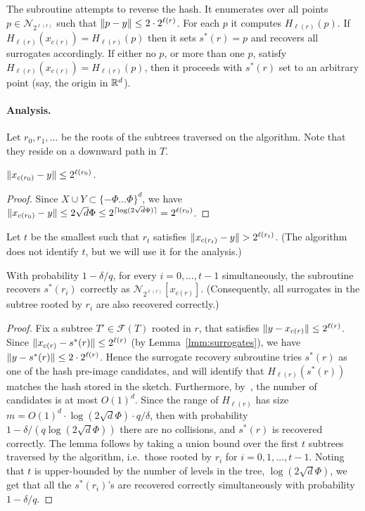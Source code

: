 The subroutine attempts to reverse the hash.
It enumerates over all points $p\in \mathcal N_{2^{\ell(r)}}$ such that $\lVert p-y\rVert\leq2\cdot2^{\ell(r)}$.
For each $p$ it computes $H_{\ell(r)}(p)$.
If $H_{\ell(r)}(x_{c(r)})=H_{\ell(r)}(p)$ then it sets $s^*(r)=p$ and recovers all surrogates accordingly.
If either no $p$, or more than one $p$, satisfy $H_{\ell(r)}(x_{c(r)})=H_{\ell(r)}(p)$, then it proceeds with $s^*(r)$ set to an arbitrary point (say, the origin in $\mathbb R^d$).

\paragraph{Analysis.} Let $r_0,r_1,\ldots$ be the roots of the subtrees traversed on the algorithm.
Note that they reside on a downward path in $T$.

\begin{claim}
$\lVert x_{c(r_0)}-y\rVert \leq 2^{\ell(r_0)}$.
\end{claim}
\begin{proof}
Since $X\cup Y\subset\{-\Phi \ldots \Phi\}^d$, we have $\lVert x_{c(r_0)}-y\rVert \leq 2\sqrt{d}\Phi\leq2^{\lceil\log(2\sqrt d\Phi)\rceil}=2^{\ell(r_0)}$.
\end{proof}

Let $t$ be the smallest such that $r_t$ satisfies $\lVert x_{c(r_t)}-y\rVert>2^{\ell(r_t)}$.
(The algorithm does not identify $t$, but we will use it for the analysis.)

\begin{lemma}\label{lmm:hashes}
With probability $1-\delta/q$, for every $i=0,\ldots,t-1$ simultaneously,
the subroutine recovers $s^*(r_i)$ correctly as $\mathcal N_{2^{\ell(r)}}[x_{c(r)}]$.
(Consequently, all surrogates in the subtree rooted by $r_i$ are also recovered correctly.)
\end{lemma}
\begin{proof}
Fix a subtree $T'\in\mathcal F(T)$ rooted in $r$, that satisfies $\lVert y-x_{c(r)}\rVert\leq2^{\ell(r)}$.
Since $\lVert x_{c(r)}-s^*(r)\rVert\leq2^{\ell(r)}$ (by Lemma~\ref{lmm:surrogates}), we have $\lVert y-s^*(r)\rVert\leq2\cdot2^{\ell(r)}$.
Hence the surrogate recovery subroutine tries $s^*(r)$ as one of the hash pre-image candidates, and will identify that $H_{\ell(r)}(s^*(r))$ matches the hash stored in the sketch.
Furthermore, by~, the number of candidates is at most $O(1)^d$.
Since the range of $H_{\ell(r)}$ has size $m=O(1)^d\cdot\log(2\sqrt d\Phi)\cdot q/\delta$, then with probability $1-\delta/(q\log(2\sqrt d\Phi))$ there are no collisions, and $s^*(r)$ is recovered correctly.
The lemma follows by taking a union bound over the first $t$ subtrees traversed by the algorithm, i.e.~those rooted by $r_i$ for $i=0,1,\ldots,t-1$. Noting that $t$ is upper-bounded by the number of levels in the tree, $\log(2\sqrt d\Phi)$, we get that all the $s^*(r_i)$'s are recovered correctly simultaneously with probability $1-\delta/q$.
\end{proof}

